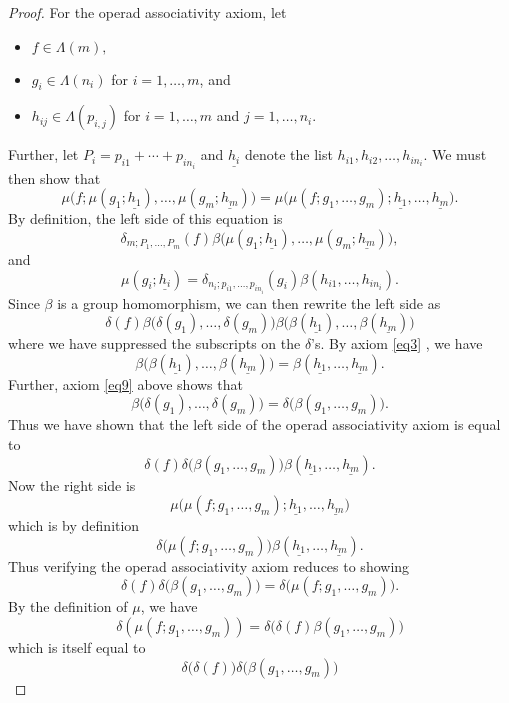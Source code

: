 \documentclass{amsbook} %
\newenvironment{eqn}{\begin{equation}}{\end{equation}}
\numberwithin{section}{chapter}
\begin{document}
\begin{proof}
For the operad associativity axiom, let
\begin{itemize}
\item $f \in \Lambda(m),$
\item $g_{i} \in \Lambda(n_{i})$ for $i=1, \ldots, m$, and
\item $h_{ij} \in \Lambda(p_{i,j})$ for $i=1, \ldots, m$ and $j=1, \ldots, n_{i}$.
\end{itemize}
Further, let $P_{i} = p_{i1} + \cdots + p_{in_{i}}$ and $\underline{h_i}$ denote the list $h_{i1}, h_{i2}, \ldots, h_{in_{i}}$.  We must then show that
\[
\mu\big( f; \mu(g_{1}; \underline{h_1}), \ldots, \mu(g_{m}; \underline{h_m}) \big) = \mu\big( \mu (f; g_{1}, \ldots, g_{m}); \underline{h_1}, \ldots, \underline{h_m} \big).
\]
By definition, the left side of this equation is
\[
\delta_{m; P_{1}, \ldots, P_{m}}(f) \beta\big( \mu(g_{1}; \underline{h_1}), \ldots, \mu(g_{m}; \underline{h_m}) \big),
\]
and
\[
\mu(g_{i}; \underline{h_i}) = \delta_{n_{i}; p_{i1}, \ldots, p_{in_{i}}}(g_{i})\beta(h_{i1}, \ldots, h_{in_{i}}).
\]
Since $\beta$ is a group homomorphism, we can then rewrite the left side as
\[
\delta(f)\beta\big(\delta(g_{1}), \ldots, \delta(g_{m})\big)\beta\big(\beta(\underline{h_1}), \ldots, \beta(\underline{h_m})\big)
\]
where we have suppressed the subscripts on the $\delta$'s.  By axiom \eqref{eq3} , we have
\[
\beta\big(\beta(\underline{h_1}), \ldots, \beta(\underline{h_m})\big) = \beta(\underline{h_1},\ldots,\underline{h_m}).
\]
Further, axiom \eqref{eq9} above shows that
\[
\beta\big(\delta(g_{1}), \ldots, \delta(g_{m})\big) = \delta\big(\beta(g_{1}, \ldots, g_{m})\big).
\]
Thus we have shown that the left side of the operad associativity axiom is equal to
\[
\delta(f)\delta\big(\beta(g_{1}, \ldots, g_{m})\big)\beta(\underline{h_1},\ldots,\underline{h_m}).
\]
Now the right side is
\[
\mu\big( \mu (f; g_{1}, \ldots, g_{m}); \underline{h_1}, \ldots, \underline{h_m} \big)
\]
which is by definition
\[
\delta\big(\mu (f; g_{1}, \ldots, g_{m})\big)\beta(\underline{h_1}, \ldots, \underline{h_m} ).
\]
Thus verifying the operad associativity axiom reduces to showing
\begin{eqn}\label{eqn:opass}
\delta(f)\delta\big(\beta(g_{1}, \ldots, g_{m})\big) = \delta\big(\mu (f; g_{1}, \ldots, g_{m})\big).
\end{eqn}By the definition of $\mu$, we have
\[
\delta(\mu (f; g_{1}, \ldots, g_{m})) = \delta\big(\delta(f)\beta(g_{1}, \ldots, g_{m}) \big)
\]
which is itself equal to
\begin{eqn}\label{eqn:opass2}
\delta\big(\delta(f)\big) \delta\big(\beta(g_{1}, \ldots, g_{m})\big)

\end{eqn}
\end{proof}
\end{document}

